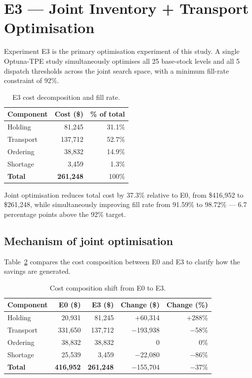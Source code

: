 \section{E3 --- Joint Inventory + Transport Optimisation}
\label{sec:results:e3}

Experiment E3 is the primary optimisation experiment of this study.  A single Optuna-TPE
study simultaneously optimises all 25 base-stock levels and all 5
dispatch thresholds across the joint search space, with a minimum
fill-rate constraint of 92\%.

\begin{table}[htbp]
  \centering
  \caption{E3 cost decomposition and fill rate.}
  \label{tab:e3}
  \begin{tabular}{@{}lrr@{}}
    \toprule
    Component & Cost (\$) & \% of total \\
    \midrule
    Holding    &  81,245 & 31.1\% \\
    Transport  & 137,712 & 52.7\% \\
    Ordering   &  38,832 & 14.9\% \\
    Shortage   &   3,459 &  1.3\% \\
    \midrule
    \textbf{Total} & \textbf{261,248} & 100\% \\
    \bottomrule
  \end{tabular}
\end{table}

Joint optimisation reduces total cost by 37.3\% relative to E0, from
\$416,952 to \$261,248, while simultaneously improving fill rate from
91.59\% to 98.72\% — 6.7 percentage points above the 92\% target.

\subsection{Mechanism of joint optimisation}

Table~\ref{tab:e3-mechanism} compares the cost composition between E0
and E3 to clarify how the savings are generated.

\begin{table}[htbp]
  \centering
  \caption{Cost composition shift from E0 to E3.}
  \label{tab:e3-mechanism}
  \begin{tabular}{@{}lrrrr@{}}
    \toprule
    Component & E0 (\$) & E3 (\$) & Change (\$) & Change (\%) \\
    \midrule
    Holding   &  20,931 &  81,245 & $+$60,314  & $+$288\% \\
    Transport & 331,650 & 137,712 & $-$193,938 & $-$58\%  \\
    Ordering  &  38,832 &  38,832 & 0          & 0\%      \\
    Shortage  &  25,539 &   3,459 & $-$22,080  & $-$86\%  \\
    \midrule
    \textbf{Total} & \textbf{416,952} & \textbf{261,248} & $-$155,704 & $-$37\% \\
    \bottomrule
  \end{tabular}
\end{table}

